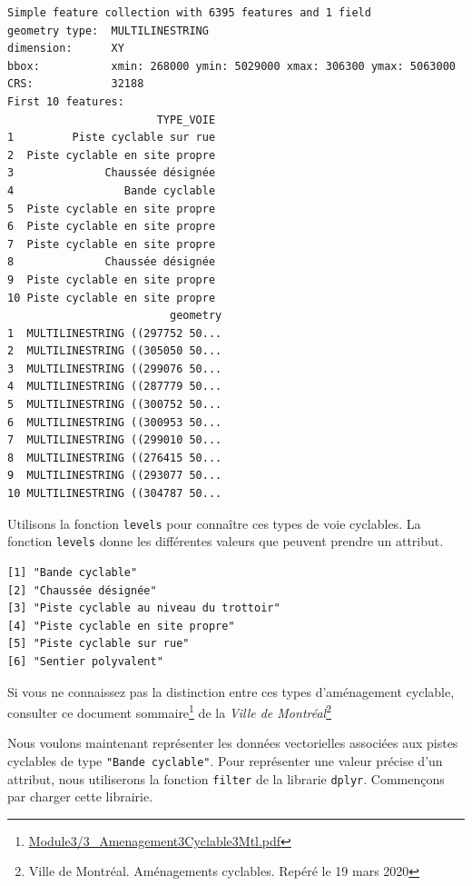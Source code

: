 \documentclass[
  12pt,
]{krantz}
\newenvironment{Shaded}{\begin{snugshade}}{\end{snugshade}}
\newcommand{\KeywordTok}[1]{\textcolor[rgb]{0.13,0.29,0.53}{\textbf{#1}}}
\newcommand{\NormalTok}[1]{#1}
\newcommand{\OperatorTok}[1]{\textcolor[rgb]{0.81,0.36,0.00}{\textbf{#1}}}
\renewcommand{\href}[2]{#2\footnote{\url{#1}}}
\begin{document}
\begin{verbatim}
Simple feature collection with 6395 features and 1 field
geometry type:  MULTILINESTRING
dimension:      XY
bbox:           xmin: 268000 ymin: 5029000 xmax: 306300 ymax: 5063000
CRS:            32188
First 10 features:
                       TYPE_VOIE
1         Piste cyclable sur rue
2  Piste cyclable en site propre
3              Chaussée désignée
4                 Bande cyclable
5  Piste cyclable en site propre
6  Piste cyclable en site propre
7  Piste cyclable en site propre
8              Chaussée désignée
9  Piste cyclable en site propre
10 Piste cyclable en site propre
                         geometry
1  MULTILINESTRING ((297752 50...
2  MULTILINESTRING ((305050 50...
3  MULTILINESTRING ((299076 50...
4  MULTILINESTRING ((287779 50...
5  MULTILINESTRING ((300752 50...
6  MULTILINESTRING ((300953 50...
7  MULTILINESTRING ((299010 50...
8  MULTILINESTRING ((276415 50...
9  MULTILINESTRING ((293077 50...
10 MULTILINESTRING ((304787 50...
\end{verbatim}

Utilisons la fonction \texttt{levels} pour connaître ces types de voie cyclables. La fonction \texttt{levels} donne les différentes valeurs que peuvent prendre un attribut.

\begin{Shaded}
\end{Shaded}

\begin{verbatim}
[1] "Bande cyclable"                      
[2] "Chaussée désignée"                   
[3] "Piste cyclable au niveau du trottoir"
[4] "Piste cyclable en site propre"       
[5] "Piste cyclable sur rue"              
[6] "Sentier polyvalent"                  
\end{verbatim}

Si vous ne connaissez pas la distinction entre ces types d'aménagement cyclable, consulter ce \href{Module3/3_Amenagement3Cyclable3Mtl.pdf}{document sommaire} de la \emph{Ville de Montréal}\footnote{Ville de Montréal. Aménagements cyclables. Repéré le 19 mars 2020}

Nous voulons maintenant représenter les données vectorielles associées aux pistes cyclables de type \texttt{"Bande\ cyclable"}. Pour représenter une valeur précise d'un attribut, nous utiliserons la fonction \texttt{filter} de la librarie \texttt{dplyr}. Commençons par charger cette librairie.
\end{document}
